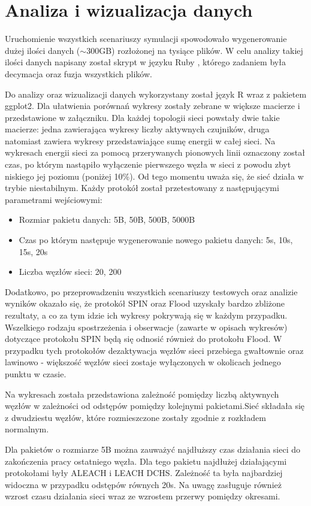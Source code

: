 \section{Analiza i wizualizacja danych}
Uruchomienie wszystkich scenariuszy symulacji spowodowało wygenerowanie dużej ilości danych ($\sim$300GB) rozłożonej na tysiące plików. W celu analizy takiej ilości danych napisany został skrypt w języku Ruby \cite{ruby}, którego zadaniem była decymacja oraz fuzja wszystkich plików.

Do analizy oraz wizualizacji danych wykorzystany został język R wraz z pakietem ggplot2. Dla ułatwienia porównań wykresy zostały zebrane w większe macierze i przedstawione w załączniku. Dla każdej topologii sieci powstały dwie takie macierze: jedna zawierająca wykresy liczby aktywnych czujników, druga natomiast zawiera wykresy przedstawiające sumę energii w całej sieci. Na wykresach energii sieci za pomocą przerywanych pionowych linii oznaczony został czas, po którym nastąpiło wyłączenie pierwszego węzła w sieci z powodu zbyt niskiego jej poziomu (poniżej 10\%). Od tego momentu uważa się, że sieć działa w trybie niestabilnym.
Każdy protokół został przetestowany z następującymi parametrami wejściowymi:
\begin{itemize}
	\item Rozmiar pakietu danych: 5B, 50B, 500B, 5000B
	\item Czas po którym następuje wygenerowanie nowego pakietu danych: 5s, 10s, 15s, 20s
	\item Liczba węzłów sieci: 20, 200
\end{itemize}

Dodatkowo, po przeprowadzeniu wszystkich scenariuszy testowych oraz analizie wyników okazało się, że protokół SPIN oraz Flood uzyskały bardzo zbliżone rezultaty, a co za tym idzie ich wykresy pokrywają się w każdym przypadku. Wszelkiego rodzaju spostrzeżenia i obserwacje (zawarte w opisach wykresów) dotyczące protokołu SPIN będą się odnosić również do protokołu Flood. 
W przypadku tych protokołów dezaktywacja węzłów sieci przebiega gwałtownie oraz lawinowo - większość węzłów sieci zostaje wyłączonych w okolicach jednego punktu w czasie.

\newpage
Na wykresach została przedstawiona zależność pomiędzy liczbą aktywnych węzłów w zależności od odstępów pomiędzy kolejnymi pakietami.Sieć składała się z dwudziestu węzłów, które rozmieszczone zostały zgodnie z rozkładem normalnym.

Dla pakietów o rozmiarze 5B można zauważyć najdłuższy czas działania sieci do zakończenia pracy ostatniego węzła. Dla tego pakietu najdłużej działającymi protokołami były ALEACH i LEACH DCHS. Zależność ta była najbardziej widoczna w przypadku odstępów równych 20s. Na uwagę zasługuje również wzrost czasu działania sieci wraz ze wzrostem przerwy pomiędzy okresami.

